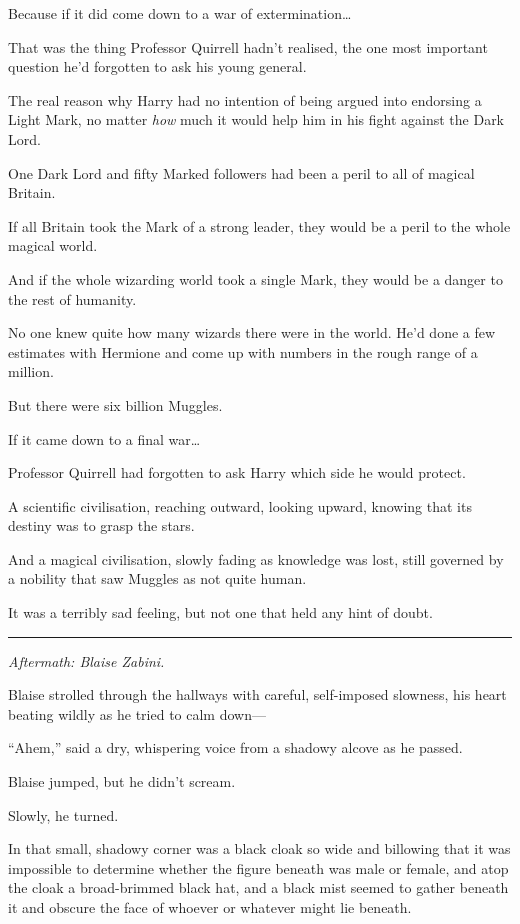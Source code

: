Because if it did come down to a war of extermination\ldots{}

That was the thing Professor Quirrell hadn't realised, the one most
important question he'd forgotten to ask his young general.

The real reason why Harry had no intention of being argued into
endorsing a Light Mark, no matter \emph{how} much it would help him in
his fight against the Dark Lord.

One Dark Lord and fifty Marked followers had been a peril to all of
magical Britain.

If all Britain took the Mark of a strong leader, they would be a peril
to the whole magical world.

And if the whole wizarding world took a single Mark, they would be a
danger to the rest of humanity.

No one knew quite how many wizards there were in the world. He'd done a
few estimates with Hermione and come up with numbers in the rough range
of a million.

But there were six billion Muggles.

If it came down to a final war\ldots{}

Professor Quirrell had forgotten to ask Harry which side he would
protect.

A scientific civilisation, reaching outward, looking upward, knowing
that its destiny was to grasp the stars.

And a magical civilisation, slowly fading as knowledge was lost, still
governed by a nobility that saw Muggles as not quite human.

It was a terribly sad feeling, but not one that held any hint of doubt.

\begin{center}\rule{3in}{0.4pt}\end{center}

\emph{Aftermath: Blaise Zabini.}

Blaise strolled through the hallways with careful, self-imposed
slowness, his heart beating wildly as he tried to calm down---

``Ahem,'' said a dry, whispering voice from a shadowy alcove as he
passed.

Blaise jumped, but he didn't scream.

Slowly, he turned.

In that small, shadowy corner was a black cloak so wide and billowing
that it was impossible to determine whether the figure beneath was male
or female, and atop the cloak a broad-brimmed black hat, and a black
mist seemed to gather beneath it and obscure the face of whoever or
whatever might lie beneath.

